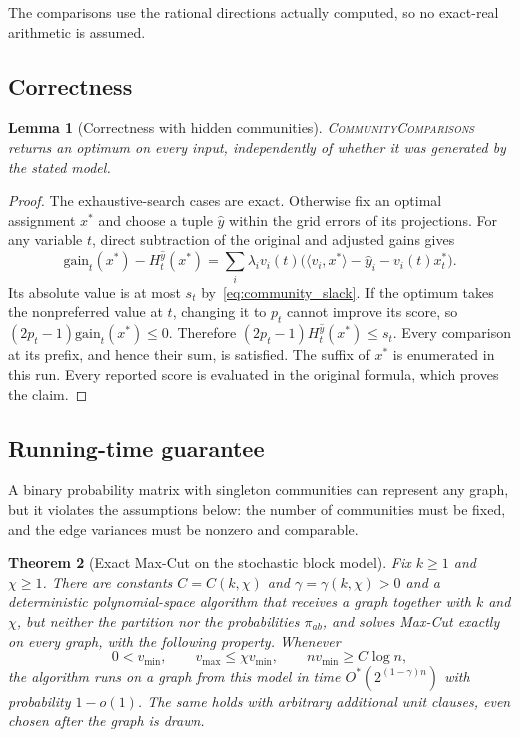 \documentclass[11pt,a4paper]{article}
\newtheorem{theorem}{Theorem}[section]
\newtheorem{lemma}[theorem]{Lemma}
\theoremstyle{definition}
\theoremstyle{remark}
\newcommand{\Ostar}{O^{*}}
\begin{document}
The comparisons use the rational directions actually computed, so no
exact-real arithmetic is assumed.

\subsection{Correctness}

\begin{lemma}[Correctness with hidden communities]\label{lem:community_correctness}
\textnormal{\textsc{CommunityComparisons}} returns an optimum on every
input, independently of whether it was generated by the stated model.
\end{lemma}
\begin{proof}
The exhaustive-search cases are exact. Otherwise fix an optimal
assignment $x^*$ and choose a tuple $\hat y$ within the grid errors of
its projections. For any variable $t$, direct subtraction of the
original and adjusted gains gives
\[
 \mathrm{gain}_t(x^*)-H_t^{\hat y}(x^*)
 =\sum_i\lambda_i v_i(t)
       \bigl(\langle v_i,x^*\rangle-\hat y_i-v_i(t)x_t^*\bigr).
\]
Its absolute value is at most $s_t$ by~\eqref{eq:community_slack}.
If the optimum takes the nonpreferred value at $t$, changing it to
$p_t$ cannot improve its score, so
$(2p_t-1)\mathrm{gain}_t(x^*)\le0$. Therefore
$(2p_t-1)H_t^{\hat y}(x^*)\le s_t$.
Every comparison at its prefix, and hence their sum, is satisfied.
The suffix of $x^*$ is enumerated in this run. Every reported score
is evaluated in the original formula, which proves the claim.
\end{proof}

\subsection{Running-time guarantee}

A binary probability matrix with singleton communities can represent any
graph, but it violates the assumptions below: the number of communities
must be fixed, and the edge variances must be nonzero and comparable.

\begin{theorem}[Exact Max-Cut on the stochastic block model]\label{thm:sbm}
Fix $k\ge1$ and $\chi\ge1$. There are constants $C=C(k,\chi)$ and
$\gamma=\gamma(k,\chi)>0$ and a deterministic polynomial-space algorithm
that receives a graph together with $k$ and $\chi$, but neither the
partition nor the probabilities $\pi_{ab}$, and solves Max-Cut exactly on
every graph, with the following property. Whenever
\begin{equation}
 0<v_{\min},\qquad v_{\max}\le\chi v_{\min},\qquad
 n v_{\min}\ge C\log n,                       \label{eq:sbmvariance}
\end{equation}
the algorithm runs on a graph from this model in time
$\Ostar(2^{(1-\gamma)n})$ with probability $1-o(1)$. The same holds with
arbitrary additional unit clauses, even chosen after the graph is drawn.
\end{theorem}
\end{document}
